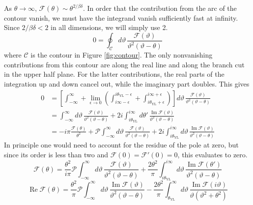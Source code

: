 \documentclass[
  aps,
  pre,
  reprint,
  longbibliography,
  floatfix
]{revtex4-2}
\begin{document}
As $\theta\to\infty$, $\mathcal F(\theta)\sim\theta^{2/\beta\delta}$. In order that the contribution from the arc of the contour vanish, we must have the integrand vanish sufficiently fast at infinity. Since $2/\beta\delta<2$ in all dimensions, we will simply use 2.
\begin{equation}
  0=\oint_{\mathcal C}d\vartheta\,\frac{\mathcal F(\vartheta)}{\vartheta^2(\vartheta-\theta)}
\end{equation}
where $\mathcal C$ is the contour in Figure \ref{fig:contour}. The only
nonvanishing contributions from this contour are along the real line and along
the branch cut in the upper half plane. For the latter contributions, the real
parts of the integration up and down cancel out, while the imaginary part
doubles. This gives
\begin{equation}
  \begin{aligned}
    0&=\left[\int_{-\infty}^\infty+\lim_{\epsilon\to0}\left(\int_{i\infty-\epsilon}^{i\theta_{\mathrm{YL}}-\epsilon}+\int^{i\infty+\epsilon}_{i\theta_{\mathrm{YL}}+\epsilon}\right)\right]
      d\vartheta\,\frac{\mathcal F(\vartheta)}{\vartheta^2(\vartheta-\theta)} \\
     &=\int_{-\infty}^\infty d\vartheta\,\frac{\mathcal F(\vartheta)}{\vartheta^2(\vartheta-\theta)}
     +2i\int_{i\theta_{\mathrm{YL}}}^{i\infty}d\theta'\,\frac{\operatorname{Im}\mathcal F(\vartheta)}{\vartheta^2(\vartheta-\theta)} \\
     &=-i\pi\frac{\mathcal F(\theta)}{\theta^2}+\mathcal P\int_{-\infty}^\infty d\vartheta\,\frac{\mathcal F(\vartheta)}{\vartheta^2(\vartheta-\theta)}
     +2i\int_{i\theta_{\mathrm{YL}}}^{i\infty}d\vartheta\,\frac{\operatorname{Im}\mathcal F(\vartheta)}{\vartheta^2(\vartheta-\theta)}
  \end{aligned}
\end{equation}
In principle one would need to account for the residue of the pole at zero, but since its order is less than two and $\mathcal F(0)=\mathcal F'(0)=0$, this evaluates to zero.
\begin{equation}
  \mathcal F(\theta)
  =\frac{\theta^2}{i\pi}\mathcal P\int_{-\infty}^\infty d\vartheta\,\frac{\mathcal F(\vartheta)}{\vartheta^2(\vartheta-\theta)}
  +\frac{2\theta^2}\pi\int_{i\theta_{\mathrm{YL}}}^{i\infty}d\vartheta\,\frac{\operatorname{Im}\mathcal F(\theta')}{\vartheta^2(\vartheta-\theta)}
\end{equation}
\begin{equation}
  \operatorname{Re}\mathcal F(\theta)
  =\frac{\theta^2}{\pi}\mathcal P\int_{-\infty}^\infty d\vartheta\,\frac{\operatorname{Im}\mathcal F(\vartheta)}{\vartheta^2(\vartheta-\theta)}
  -\frac{2\theta^2}\pi\int_{\theta_{\mathrm{YL}}}^{\infty}d\vartheta\,\frac{\operatorname{Im}\mathcal F(i\vartheta)}{\vartheta(\vartheta^2+\theta^2)}
\end{equation}
\end{document}
